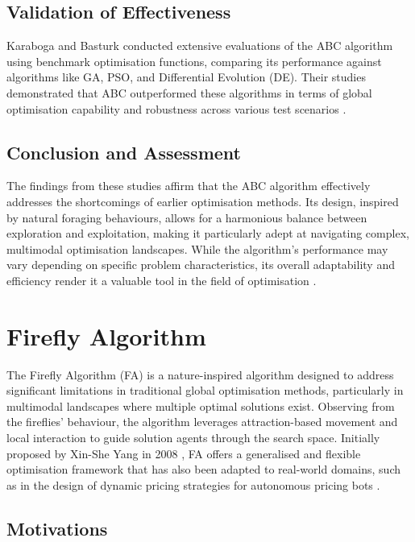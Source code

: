 \documentclass[a4paper, 12pt]{extarticle}
\begin{document}
\subsection{Validation of Effectiveness}
Karaboga and Basturk conducted extensive evaluations of the ABC algorithm using benchmark optimisation functions, comparing its performance against algorithms like GA, PSO, and Differential Evolution (DE). Their studies demonstrated that ABC outperformed these algorithms in terms of global optimisation capability and robustness across various test scenarios \cite{karaboga2007powerful}\cite{karaboga2007artificial}.

\subsection{Conclusion and Assessment}
The findings from these studies affirm that the ABC algorithm effectively addresses the shortcomings of earlier optimisation methods. Its design, inspired by natural foraging behaviours, allows for a harmonious balance between exploration and exploitation, making it particularly adept at navigating complex, multimodal optimisation landscapes. While the algorithm's performance may vary depending on specific problem characteristics, its overall adaptability and efficiency render it a valuable tool in the field of optimisation \cite{kaya2022review}.

\newpage
\section{Firefly Algorithm} 

The Firefly Algorithm (FA) is a nature-inspired algorithm designed to address significant limitations in traditional global optimisation methods, particularly in multimodal landscapes where multiple optimal solutions exist. Observing from the fireflies’ behaviour, the algorithm leverages attraction-based movement and local interaction to guide solution agents through the search space. Initially proposed by Xin-She Yang in 2008 \cite{yang2009firefly}, FA offers a generalised and flexible optimisation framework that has also been adapted to real-world domains, such as in the design of dynamic pricing strategies for autonomous pricing bots \cite{jumadinova2008firefly}. 

\subsection{Motivations}
\end{document}
